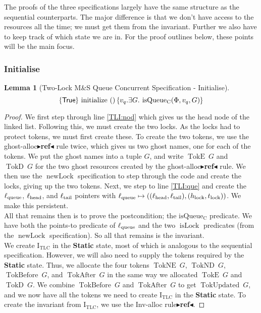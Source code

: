 \documentclass[a4paper, 10pt]{report}
\theoremstyle{definition}
\newtheorem{lemma}[theorem]{Lemma}
\newcommand{\isLock}{\operatorname{isLock}}
\newcommand{\newLock}{\operatorname{newLock}}
\newcommand{\initialise}{\operatorname{initialize}}
\newcommand{\msq}{M\&S Queue}
\newcommand{\tlmsq}{Two-Lock \msq{}}
\newcommand{\isqueueconc}{\operatorname{isQueue_{C}}}
\newcommand{\TLQueueInvariantConc}{\operatorname{I_{TLC}}}
\newcommand{\vq}{v_q}
\newcommand{\locN}[1]{\loc_{\mathrm{#1}}}
\newcommand{\lochead}{\locN{head}}
\newcommand{\loctail}{\locN{tail}}
\newcommand{\locqueue}{\locN{queue}}
\newcommand{\Hlock}{h_{\mathrm{lock}}}
\newcommand{\Tlock}{t_{\mathrm{lock}}}
\newcommand{\StaticState}{\textbf{Static}\xspace}
\newcommand{\Qg}{G}
\newcommand{\TokE}[1]{\operatorname{TokE} ~ #1}
\newcommand{\TokEQg}{\TokE{\Qg}}
\newcommand{\TokNE}[1]{\operatorname{TokNE} ~ #1}
\newcommand{\TokNEQg}{\TokNE{\Qg}}
\newcommand{\TokD}[1]{\operatorname{TokD} ~ #1}
\newcommand{\TokDQg}{\TokD{\Qg}}
\newcommand{\TokND}[1]{\operatorname{TokND} ~ #1}
\newcommand{\TokNDQg}{\TokND{\Qg}}
\newcommand{\TokBefore}[1]{\operatorname{TokBefore} ~ #1}
\newcommand{\TokBeforeQg}{\TokBefore{\Qg}}
\newcommand{\TokAfter}[1]{\operatorname{TokAfter} ~ #1}
\newcommand{\TokAfterQg}{\TokAfter{\Qg}}
\newcommand{\TokUpdated}[1]{\operatorname{TokUpdated} ~ #1}
\newcommand{\TokUpdatedQg}{\TokUpdated{\Qg}}
\newcommand{\tlconcspecinitHTGen}[3]{\hoare{\TRUE}{\initialise \ \TT}{#2 . \Exists #3. \isqueueconc(#1, #2, #3)}}
\newcommand{\tlconcspecinitGen}[3]{\tlconcspecinitHTGen{#1}{#2}{#3}}
\newcommand{\tlconcspecinit}[1]{\tlconcspecinitGen{#1}{\vq}{\Qg}}
\newcommand{\todo}[1]{{\color[rgb]{.5,0,0}\textbf{$\blacktriangleright$#1$\blacktriangleleft$}}}
\begin{document}
The proofs of the three specifications largely have the same structure as the sequential counterparts. The major difference is that we don't have access to the resources all the time; we must get them from the invariant. Further we also have to keep track of which state we are in. For the proof outlines below, these points will be the main focus.

\subsubsection{Initialise}
\begin{lemma}[\tlmsq{} Concurrent Specification - Initialise]\label{TLMSQ:spec:conc:init}
  \begin{equation*}
    \tlconcspecinit{\Phi}
  \end{equation*}
\end{lemma}
\begin{proof}
We first step through line \ref{TLI:nod} which gives us the head node of the linked list. Following this, we must create the two locks. As the locks had to protect tokens, we must first create these. To create the two tokens, we use the ghost-alloc\todo{ref} rule twice, which gives us two ghost names, one for each of the tokens. We put the ghost names into a tuple $\Qg$, and write $\TokEQg$ and $\TokDQg$ for the two ghost resources created by the ghost-alloc\todo{ref} rule. We then use the $\newLock$ specification to step through the code and create the locks, giving up the two tokens. Next, we step to line \ref{TLI:que} and create the $\locqueue$, $\lochead$, and $\loctail$ pointers with $\locqueue \mapsto ((\lochead, \loctail), (\Hlock, \Tlock))$. We make this persistent.\\
All that remains then is to prove the postcondition; the $\isqueueconc$ predicate. We have both the points-to predicate of $\locqueue$ and the two $\isLock$ predicates (from the $\newLock$ specification). So all that remains is the invariant.\\
We create $\TLQueueInvariantConc$ in the \StaticState state, most of which is analogous to the sequential specification. However, we will also need to supply the tokens required by the \StaticState state. Thus, we allocate the four tokens $\TokNEQg$, $\TokNDQg$, $\TokBeforeQg$, and $\TokAfterQg$ in the same way we allocated $\TokEQg$ and $\TokDQg$. We combine $\TokBeforeQg$ and $\TokAfterQg$ to get $\TokUpdatedQg$, and we now have all the tokens we need to create $\TLQueueInvariantConc$ in the \StaticState state. To create the invariant from $\TLQueueInvariantConc$, we use the Inv-alloc rule\todo{ref}.
\end{proof}
\end{document}
